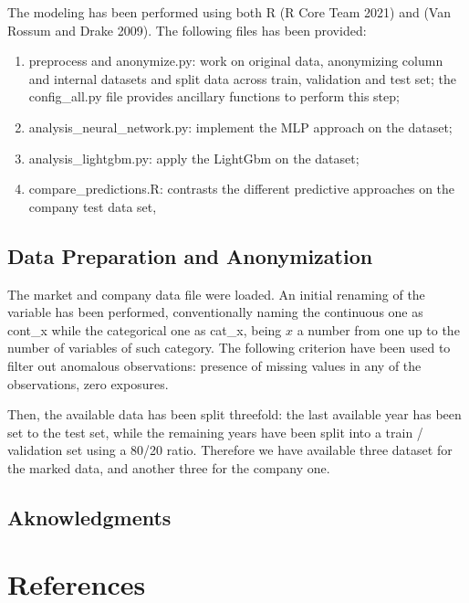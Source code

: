 \documentclass[
]{article}
\begin{document}
The modeling has been performed using both R (R Core Team 2021) and (Van
Rossum and Drake 2009). The following files has been provided:

\begin{enumerate}
\def\labelenumi{\arabic{enumi}.}
\setcounter{enumi}{-1}
\item
  preprocess and anonymize.py: work on original data, anonymizing column
  and internal datasets and split data across train, validation and test
  set; the config\_all.py file provides ancillary functions to perform
  this step;
\item
  analysis\_neural\_network.py: implement the MLP approach on the
  dataset;
\item
  analysis\_lightgbm.py: apply the LightGbm on the dataset;
\item
  compare\_predictions.R: contrasts the different predictive approaches
  on the company test data set,
\end{enumerate}

\hypertarget{data-preparation-and-anonymization}{%
\subsection{Data Preparation and
Anonymization}\label{data-preparation-and-anonymization}}

The market and company data file were loaded. An initial renaming of the
variable has been performed, conventionally naming the continuous one as
cont\_x while the categorical one as cat\_x, being \(x\) a number from
one up to the number of variables of such category. The following
criterion have been used to filter out anomalous observations: presence
of missing values in any of the observations, zero exposures.

Then, the available data has been split threefold: the last available
year has been set to the test set, while the remaining years have been
split into a train / validation set using a 80/20 ratio. Therefore we
have available three dataset for the marked data, and another three for
the company one.

\hypertarget{aknowledgments}{%
\subsection{Aknowledgments}\label{aknowledgments}}

\hypertarget{references}{%
\section*{References}\label{references}}
\end{document}
